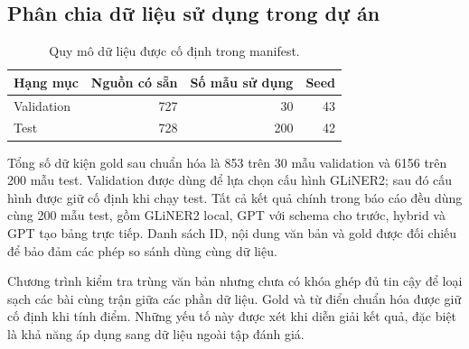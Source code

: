 \subsection{Phân chia dữ liệu sử dụng trong dự án}
\begin{table}[H]
\centering
\begin{tabularx}{\linewidth}{@{}Yrrr@{}}
\toprule\textbf{Hạng mục} & \textbf{Nguồn có sẵn} & \textbf{Số mẫu sử dụng} & \textbf{Seed}\\\midrule
Validation & 727 & 30 & 43\\
Test & 728 & 200 & 42\\
\bottomrule
\end{tabularx}
\caption{Quy mô dữ liệu được cố định trong manifest.}
\end{table}

Tổng số dữ kiện gold sau chuẩn hóa là 853 trên 30 mẫu validation và 6156 trên 200 mẫu test. Validation được dùng để lựa chọn cấu hình GLiNER2; sau đó cấu hình được giữ cố định khi chạy test. Tất cả kết quả chính trong báo cáo đều dùng cùng 200 mẫu test, gồm GLiNER2 local, GPT với schema cho trước, hybrid và GPT tạo bảng trực tiếp. Danh sách ID, nội dung văn bản và gold được đối chiếu để bảo đảm các phép so sánh dùng cùng dữ liệu.

Chương trình kiểm tra trùng văn bản nhưng chưa có khóa ghép đủ tin cậy để loại sạch các bài cùng trận giữa các phần dữ liệu. Gold và từ điển chuẩn hóa được giữ cố định khi tính điểm. Những yếu tố này được xét khi diễn giải kết quả, đặc biệt là khả năng áp dụng sang dữ liệu ngoài tập đánh giá.
